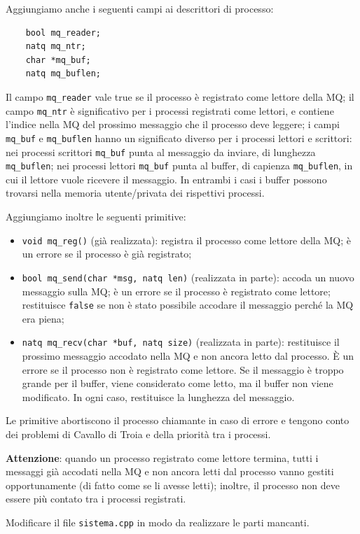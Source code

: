 Aggiungiamo anche i seguenti campi ai descrittori di processo:
\begin{verbatim}
    bool mq_reader;
    natq mq_ntr;
    char *mq_buf;
    natq mq_buflen;
\end{verbatim}
Il campo \verb|mq_reader| vale true se il processo \`e registrato come lettore della MQ;
il campo \verb|mq_ntr| \`e significativo per i processi registrati come lettori, e contiene
l'indice nella MQ del prossimo messaggio che il processo deve leggere; i campi \verb|mq_buf|
e \verb|mq_buflen| hanno un significato diverso per i processi lettori e scrittori:
nei processi scrittori \verb|mq_buf| punta al messaggio da inviare, di lunghezza \verb|mq_buflen|;
nei processi lettori \verb|mq_buf| punta al buffer, di capienza \verb|mq_buflen|, in cui
il lettore vuole ricevere il messaggio. In entrambi i casi i buffer possono trovarsi
nella memoria utente/privata dei rispettivi processi.

Aggiungiamo inoltre le seguenti primitive:
\begin{itemize}
  \item \verb|void mq_reg()| (gi\`a realizzata):
    registra il processo come lettore della MQ; \`e un errore se il processo \`e gi\`a registrato;
  \item \verb|bool mq_send(char *msg, natq len)| (realizzata in parte):
    accoda un nuovo messaggio sulla MQ; \`e un errore se il processo \`e registrato come
    lettore; restituisce \verb|false| se non \`e stato possibile accodare il messaggio perch\'e
    la MQ era piena;
  \item \verb|natq mq_recv(char *buf, natq size)| (realizzata in parte):
    restituisce il prossimo messaggio accodato nella MQ e non ancora letto dal processo.
    \`E un errore se il processo non \`e registrato come lettore.
    Se il messaggio \`e troppo grande per il buffer, viene considerato come letto, ma il
    buffer non viene modificato. In ogni caso, restituisce la lunghezza del messaggio.
\end{itemize}

Le primitive abortiscono il processo chiamante in caso di errore e tengono conto dei problemi
di Cavallo di Troia e della priorit\`a tra i processi.

{\bf Attenzione}: quando un processo registrato come lettore termina, tutti i messaggi
gi\`a accodati nella MQ e non ancora letti dal processo vanno gestiti opportunamente
(di fatto come se li avesse letti); 
inoltre, il processo non deve essere pi\`u contato tra i processi registrati.

Modificare il file \verb|sistema.cpp| in modo da realizzare le parti mancanti.
